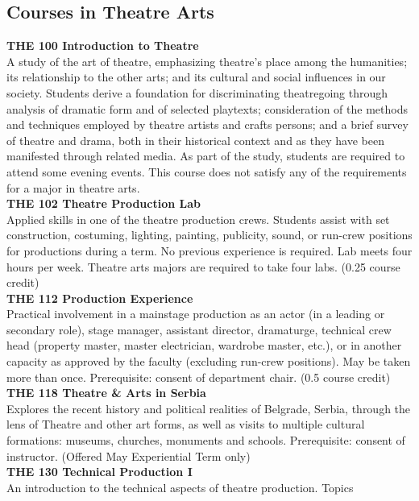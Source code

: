 \documentclass[
  letterpaper,
]{scrbook}
\begin{document}
\subsection{Courses in Theatre Arts}\label{sec-courses-in-theatre-arts}

\textbf{THE 100 Introduction to Theatre}\\
A study of the art of theatre, emphasizing theatre's place among the
humanities; its relationship to the other arts; and its cultural and
social influences in our society. Students derive a foundation for
discriminating theatregoing through analysis of dramatic form and of
selected playtexts; consideration of the methods and techniques employed
by theatre artists and crafts persons; and a brief survey of theatre and
drama, both in their historical context and as they have been manifested
through related media. As part of the study, students are required to
attend some evening events. This course does not satisfy any of the
requirements for a major in theatre arts.\\
\textbf{THE 102 Theatre Production Lab}\\
Applied skills in one of the theatre production crews. Students assist
with set construction, costuming, lighting, painting, publicity, sound,
or run-crew positions for productions during a term. No previous
experience is required. Lab meets four hours per week. Theatre arts
majors are required to take four labs. (0.25 course credit)\\
\textbf{THE 112 Production Experience}\\
Practical involvement in a mainstage production as an actor (in a
leading or secondary role), stage manager, assistant director,
dramaturge, technical crew head (property master, master electrician,
wardrobe master, etc.), or in another capacity as approved by the
faculty (excluding run-crew positions). May be taken more than once.
Prerequisite: consent of department chair. (0.5 course credit)\\
\textbf{THE 118 Theatre \& Arts in Serbia}\\
Explores the recent history and political realities of Belgrade, Serbia,
through the lens of Theatre and other art forms, as well as visits to
multiple cultural formations: museums, churches, monuments and schools.
Prerequisite: consent of instructor. (Offered May Experiential Term
only)\\
\textbf{THE 130 Technical Production I}\\
An introduction to the technical aspects of theatre production. Topics
\end{document}
